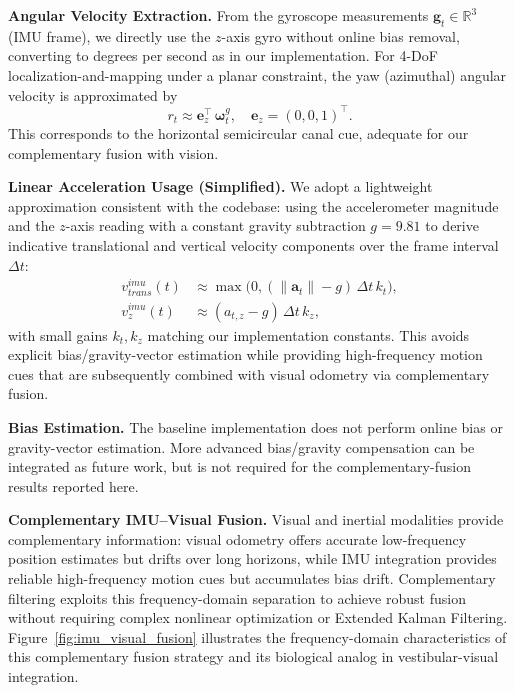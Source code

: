 \textbf{Angular Velocity Extraction.} From the gyroscope measurements $\mathbf{g}_t\in\mathbb{R}^3$ (IMU frame), we directly use the $z$-axis gyro without online bias removal, converting to degrees per second as in our implementation. For 4-DoF lo\-cal\-i\-za\-tion-and-map\-ping under a planar constraint, the yaw (azimuthal) angular velocity is approximated by
\begin{equation}
    r_t \approx \mathbf{e}_z^\top\,\boldsymbol{\omega}_t^g,\quad \mathbf{e}_z=(0,0,1)^\top.
\end{equation}
This corresponds to the horizontal semicircular canal cue, adequate for our complementary fusion with vision.

\textbf{Linear Acceleration Usage (Simplified).} We adopt a lightweight approximation consistent with the codebase: using the accelerometer magnitude and the $z$-axis reading with a constant gravity subtraction $g\!=\!9.81$ to derive indicative translational and vertical velocity components over the frame interval $\Delta t$:
\begin{align}
    v^{imu}_{trans}(t) & \approx \max\big(0, (\lVert\mathbf{a}_t\rVert - g)\,\Delta t\,k_t\big), \\
    v^{imu}_{z}(t)     & \approx (a_{t,z} - g)\,\Delta t\,k_z,
\end{align}
with small gains $k_t, k_z$ matching our implementation constants. This avoids explicit bias/gravity-vector estimation while providing high-frequency motion cues that are subsequently combined with visual odometry via complementary fusion.

\textbf{Bias Estimation.} The baseline implementation does not perform online bias or gravity-vector estimation. More advanced bias/gravity compensation can be integrated as future work, but is not required for the complementary-fusion results reported here.

\textbf{Com\-ple\-men\-tary IMU--Visual Fusion.} Visual and inertial modalities provide complementary information: visual odometry offers accurate low-frequency position estimates but drifts over long horizons, while IMU integration provides reliable high-frequency motion cues but accumulates bias drift. Com\-ple\-men\-tary filtering exploits this frequency-domain separation to achieve robust fusion without requiring complex nonlinear optimization or Extended Kalman Filtering. Figure~\ref{fig:imu_visual_fusion} illustrates the frequency-domain characteristics of this complementary fusion strategy and its biological analog in ves\-tib\-u\-lar-visual integration.

